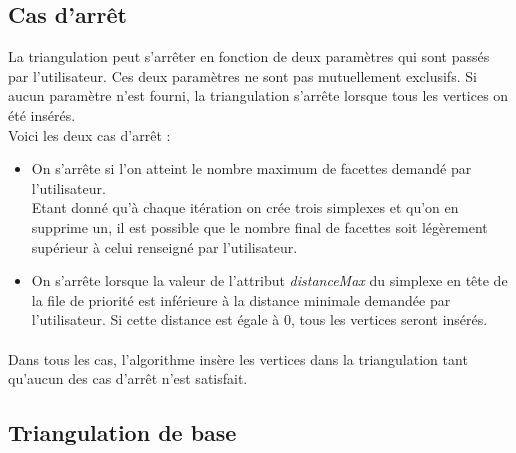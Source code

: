 \documentclass{article}
\begin{document}
    \subsection{Cas d'arrêt}
    \label{triangulationDelaunay}
        La triangulation peut s'arrêter en fonction de deux paramètres qui sont passés par l'utilisateur. Ces deux paramètres ne sont pas mutuellement exclusifs. Si aucun paramètre n'est fourni, la triangulation s'arrête lorsque tous les vertices on été insérés.
        \\Voici les deux cas d'arrêt :
        \begin{itemize}
        \item On s'arrête si l'on atteint le nombre maximum de facettes demandé par l'utilisateur. 
        \\Etant donné qu'à chaque itération on crée trois simplexes et qu'on en supprime un, il est possible que le nombre final de facettes soit légèrement supérieur à celui renseigné par l'utilisateur.
        \item On s'arrête lorsque la valeur de l'attribut \textit{distanceMax} du simplexe en tête de la file de priorité est inférieure à la distance minimale demandée par l'utilisateur. Si cette distance est égale à $0$, tous les vertices seront insérés.
        \end{itemize}
    
    \paragraph{}
    Dans tous les cas, l'algorithme insère les vertices dans la triangulation tant qu'aucun des cas d'arrêt n'est satisfait.
        
    \subsection{Triangulation de base}
\end{document}
